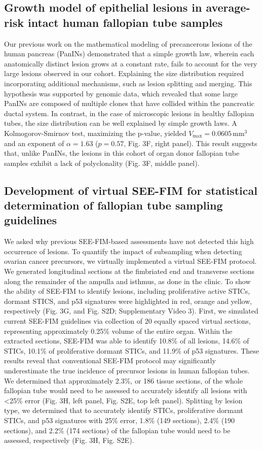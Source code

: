 \begin{refsection}
    \subsection{Growth model of epithelial lesions in average-risk intact human fallopian tube samples}
    Our previous work on the mathematical modeling of precancerous lesions of the human pancreas (PanINs) demonstrated that a simple growth law, wherein each anatomically distinct lesion grows at a constant rate, fails to account for the very large lesions observed in our cohort. Explaining the size distribution required incorporating additional mechanisms, such as lesion splitting and merging. This hypothesis was supported by genomic data, which revealed that some large PanINs are composed of multiple clones that have collided within the pancreatic ductal system. In contrast, in the case of microscopic lesions in healthy fallopian tubes, the size distribution can be well explained by simple growth laws. A Kolmogorov-Smirnov test, maximizing the p-value, yielded \(V_\text{max} = 0.0605 \, \text{mm}^3\) and an exponent of \(\alpha = 1.63\) (\(p = 0.57\), Fig. 3F, right panel). This result suggests that, unlike PanINs, the lesions in this cohort of organ donor fallopian tube samples exhibit a lack of polyclonality (Fig. 3F, middle panel).
    
    \subsection{Development of virtual SEE-FIM for statistical determination of fallopian tube sampling guidelines}
    We asked why previous SEE-FIM-based assessments have not detected this high occurrence of lesions. To quantify the impact of subsampling when detecting ovarian cancer precursors, we virtually implemented a virtual SEE-FIM protocol. We generated longitudinal sections at the fimbriated end and transverse sections along the remainder of the ampulla and isthmus, as done in the clinic. To show the ability of SEE-FIM to identify lesions, including proliferative active STICs,  dormant STICS, and p53 signatures were highlighted in red, orange and yellow, respectively (Fig. 3G, and Fig. S2D; Supplementary Video 3).
    First, we simulated current SEE-FIM guidelines via collection of 20 equally spaced virtual sections, representing approximately 0.25\% volume of the entire organ. Within the extracted sections, SEE-FIM was able to identify 10.8\% of all lesions, 14.6\% of STICs, 10.1\% of proliferative dormant STICs, and 11.9\% of p53 signatures. These results reveal that conventional SEE-FIM protocol may significantly underestimate the true incidence of precursor lesions in human fallopian tubes. We determined that approximately 2.3\%, or 186 tissue sections, of the whole fallopian tube would need to be assessed to accurately identify all lesions with <25\% error (Fig. 3H, left panel, Fig. S2E, top left panel). Splitting by lesion type, we determined that to accurately identify STICs, proliferative dormant STICs, and p53 signatures with 25\% error, 1.8\% (149 sections), 2.4\% (190 sections), and 2.2\% (174 sections) of the fallopian tube would need to be assessed, respectively (Fig. 3H, Fig. S2E). 


\end{refsection}
